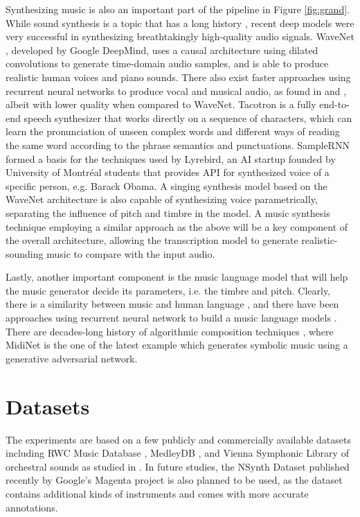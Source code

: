 Synthesizing music is also an important part of the pipeline in Figure \ref{fig:grand}.
While sound synthesis is a topic that has a long history \cite{cook2002synthesis}, recent deep models were very successful in synthesizing breathtakingly high-quality audio signals.
WaveNet \cite{oord2016wavenet}, developed by Google DeepMind, uses a causal architecture using dilated convolutions to generate time-domain audio samples, and is able to produce realistic human voices and piano sounds.
There also exist faster approaches using recurrent neural networks to produce vocal and musical audio, as found in \cite{nayebi2015gruv} and \cite{kalingeri2016generation}, albeit with lower quality when compared to WaveNet.
Tacotron \cite{wang2017tacotron} is a fully end-to-end speech synthesizer that works directly on a sequence of characters, which can learn the pronunciation of unseen complex words and different ways of reading the same word according to the phrase semantics and punctuations.
SampleRNN \cite{mehri2016samplernn} formed a basis for the techniques used by Lyrebird, an AI startup founded by University of Montr\'{e}al students that provides API for synthesized voice of a specific person, e.g. Barack Obama.
A singing synthesis model \cite{blaauw2017singing} based on the WaveNet architecture is also capable of synthesizing voice parametrically, separating the influence of pitch and timbre in the model.
A music synthesis technique employing a similar approach as the above will be a key component of the overall architecture, allowing the transcription model to generate realistic-sounding music to compare with the input audio.

Lastly, another important component is the music language model that will help the music generator decide its parameters, i.e. the timbre and pitch.
Clearly, there is a similarity between music and human language \cite{patel2010musiclanguage}, and there have been approaches using recurrent neural network to build a music language models \cite{sigtia2014lm}.
There are decades-long history of algorithmic composition techniques \cite{fernandez2013ai}, where MidiNet \cite{yang2017midinet} is the one of the latest example which generates symbolic music using a generative adversarial network.

\section{Datasets}

The experiments are based on a few publicly and commercially available datasets including RWC Music Database \cite{goto2003rwc}, MedleyDB \cite{bittner2014medleydb}, and Vienna Symphonic Library of orchestral sounds as studied in \cite{humphrey2011nlse}.
In future studies, the NSynth Dataset published recently by Google's Magenta project \cite{engel2017nsynth} is also planned to be used, as the dataset contains additional kinds of instruments and comes with more accurate annotations.


